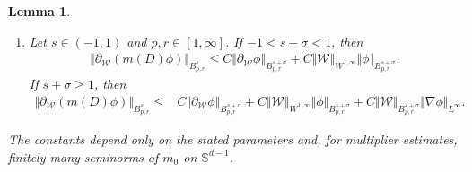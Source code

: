 \documentclass[reqno,11pt,a4paper]{amsart}
\newtheorem{lemma}[theorem]{Lemma}
\begin{document}
\begin{lemma}
\begin{enumerate}[(1)]
\item
Let $s\in(-1,1)$ and $p,r\in[1,\infty]$.
If $-1<s+\sigma<1$, then
\begin{equation}\label{eq:paWmD-es}
\begin{aligned}
  \Vert \partial_{\mathcal W}(m(D)\phi)\Vert _{B^s_{p,r}}
  \leq {}
  C\Vert \partial_{\mathcal W}\phi\Vert _{B^{s+\sigma}_{p,r}}
  +C\Vert \mathcal W\Vert _{W^{1,\infty}}
  \Vert \phi\Vert _{B^{s+\sigma}_{p,r}}.
\end{aligned}
\end{equation}
If $s+\sigma\geq1$, then
\begin{equation}\label{eq:paWmD-es2}
\begin{aligned}
  \Vert \partial_{\mathcal W}(m(D)\phi)\Vert _{B^s_{p,r}}
  \leq {}&
  C\Vert \partial_{\mathcal W}\phi\Vert _{B^{s+\sigma}_{p,r}}
  +C\Vert \mathcal W\Vert _{W^{1,\infty}}
  \Vert \phi\Vert _{B^{s+\sigma}_{p,r}}
  +C\Vert \mathcal W\Vert _{B^{s+\sigma}_{p,r}}
  \Vert \nabla\phi\Vert _{L^\infty}.
\end{aligned}
\end{equation}
\end{enumerate}

The constants depend only on the stated parameters and,
for multiplier estimates, finitely many seminorms
of $m_0$ on $\mathbb S^{d-1}$.
\end{lemma}
\end{document}
